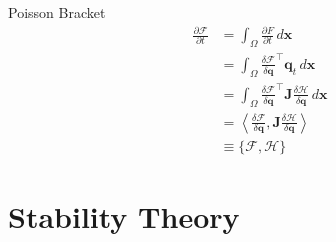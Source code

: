 \documentclass{beamer}
\begin{document}
		\begin{frame}[t]{Poisson Bracket}
			\begin{align*}
					\frac{\partial \mathcal{F}}{\partial t}
					&= \int_\Omega \frac{\partial F}{\partial t} \, d\mathbf{x} \\
					&= \int_\Omega \frac{\delta \mathcal{F}}{\delta \mathbf{q}}^\top \mathbf{q}_t\, d\mathbf{x} \\
					&= \int_\Omega \frac{\delta \mathcal{F}}{\delta \mathbf{q}}^\top \mathbf{J}\frac{\delta \mathcal{H}}{\delta \mathbf{q}}\, d\mathbf{x} \\
					&= \left< \frac{\delta \mathcal{F}}{\delta \mathbf{q}}, \mathbf{J}\frac{\delta \mathcal{H}}{\delta \mathbf{q}} \right> \\
					&\equiv \{\mathcal{F}, \mathcal{H}\}
				\end{align*}
		\end{frame}

	\section{Stability Theory}
\end{document}
